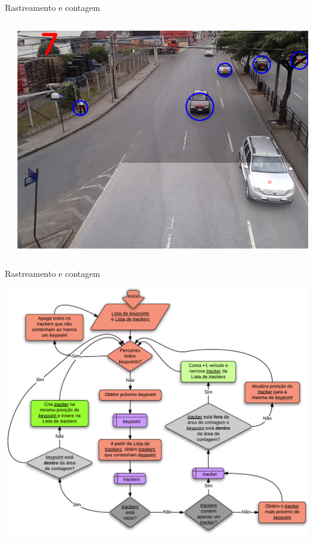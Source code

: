 \begin{frame}{Rastreamento e contagem}
  \begin{columns}[T]
    \begin{column}{.5\textwidth}
      
    \end{column}
    \begin{column}{.5\textwidth}
      \begin{block}{}
        \includegraphics[width=\textwidth]{imgs/trackers.png}
      \end{block}{}
    \end{column}
  \end{columns}
\end{frame}

\begin{frame}{Rastreamento e contagem}
  \begin{center}
    \includegraphics[scale=0.417]{imgs/fluxograma_contagem.pdf}
  \end{center}
\end{frame}

